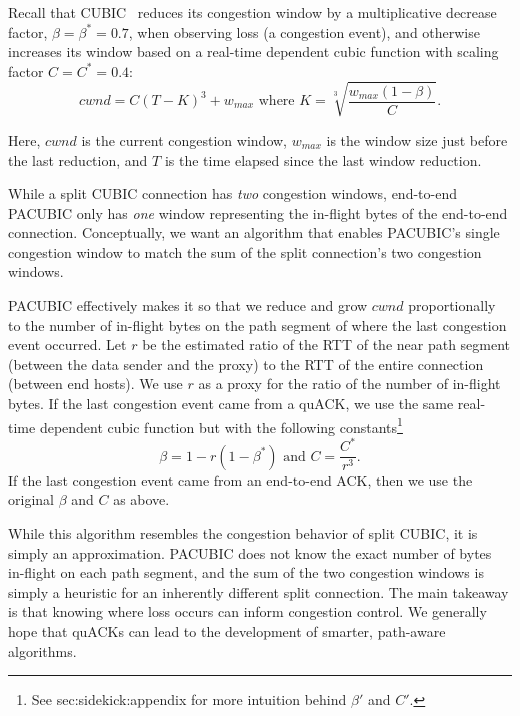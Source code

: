 Recall that CUBIC~\cite{ha2008cubic} reduces its congestion window by a
multiplicative decrease factor,
$\beta = \beta^* = 0.7$, when observing loss (a congestion event), and otherwise
increases its window based on a real-time dependent cubic function with scaling
factor $C=C^*=0.4$:
\[
cwnd = C(T-K)^3 + w_{max} \text{ where } K = \sqrt[3]{\frac{w_{max}(1-\beta)}{C}}.
\]

\noindent Here, $cwnd$ is the current congestion window,
$w_{max}$ is the window size just before the last reduction,
and $T$ is the time elapsed since the last window reduction.

While a split CUBIC connection has \emph{two} congestion windows,
end-to-end PACUBIC only has \emph{one} window representing the in-flight bytes
of the end-to-end connection.
Conceptually, we want an algorithm that enables PACUBIC's single
congestion window to match the sum of the split connection's two congestion
windows.

PACUBIC effectively makes it so that we reduce and grow $cwnd$
proportionally to the number of in-flight bytes on the path segment
of where the last congestion event occurred.
Let $r$ be the estimated ratio of the RTT of the near path segment
(between the data sender and the proxy) to the RTT of the entire connection
(between end hosts).
We use $r$ as a proxy for the ratio of the number of in-flight bytes. If the
last congestion event came from a quACK, we use the same real-time dependent
cubic function but with the following constants\footnote{See \Cref
{sec:sidekick:appendix} for more intuition behind $\beta'$ and $C'$.}
\[
\beta = 1 - r(1-\beta^*)\text{ and }C = \frac{C^*}{r^3}.
\]
\noindent If the last congestion event came from an end-to-end ACK, then we use
the original $\beta$ and $C$ as above.

While this algorithm resembles the congestion behavior of split CUBIC, it is
simply an approximation. PACUBIC does not know the exact number of bytes
in-flight on each path segment, and the sum of the two congestion windows is
simply a heuristic for an inherently different split connection. The main
takeaway is that knowing where loss occurs can inform congestion control. We
generally hope that quACKs can lead to the development of smarter, path-aware
algorithms.
